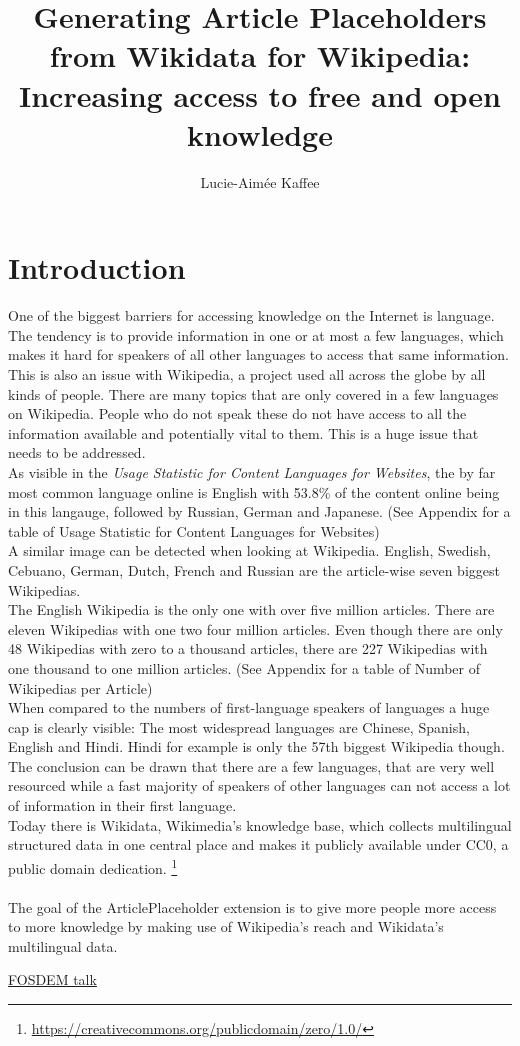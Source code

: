 \documentclass[11pt]{article}
\title{Generating Article Placeholders from Wikidata for Wikipedia:\\Increasing access to free and open knowledge}
\author{Lucie-Aim\'{e}e Kaffee}
\date{}
\begin{document}
\section{Introduction}
One of the biggest barriers for accessing knowledge on the Internet is language. The tendency is to provide information in one or at most a few languages, which makes it hard for speakers of all other languages to access that same information. This is also an issue with Wikipedia, a project used all across the globe by all kinds of people. There are many topics that are only covered in a few languages on Wikipedia. People who do not speak these do not have access to all the information available and potentially vital to them. This is a huge issue that needs to be addressed. \\
As visible in the \textit{Usage Statistic for Content Languages for Websites}, the by far most common language online is English with 53.8\% of the content online being in this langauge, followed by Russian, German and Japanese. (See Appendix for a table of Usage Statistic for Content Languages for Websites) \\
A similar image can be detected when looking at Wikipedia. English, Swedish, Cebuano, German, Dutch, French and Russian are the article-wise seven biggest Wikipedias. \\
The English Wikipedia is the only one with over five million articles. There are eleven Wikipedias with one two four million articles. Even though there are only 48 Wikipedias with zero to a thousand articles, there are 227 Wikipedias with one thousand to one million articles. (See Appendix for a table of Number of Wikipedias per Article) \\
When compared to the numbers of first-language speakers of languages a huge cap is clearly visible: The most widespread languages are Chinese, Spanish, English and Hindi. Hindi for example is only the 57th biggest Wikipedia though. \\
The conclusion can be drawn that there are a few languages, that are very well resourced while a fast majority of speakers of other languages can not access a lot of information in their first language. 
\newline \\
Today there is Wikidata, Wikimedia’s knowledge base, which collects multilingual structured data in one central place and makes it publicly available under CC0, a public domain dedication. \footnote{\href{https://creativecommons.org/publicdomain/zero/1.0/}{https://creativecommons.org/publicdomain/zero/1.0/}} \\
\\
The goal of the ArticlePlaceholder extension  is to give more people more access to more knowledge by making use of Wikipedia’s reach and Wikidata’s multilingual data.


\href{https://www.fosdem.org/2016/schedule/event/increasing_access_to_free_and_open_knowledge_for_speakers_of_underserved_languages_on_wikipedia/}{FOSDEM talk}
\end{document}

